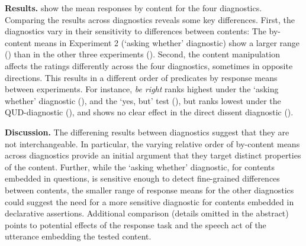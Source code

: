 \documentclass[11pt, a4paper]{article}
\begin{document}
\vspace{.1\baselineskip} \noindent
{\bf Results.}
   show the mean responses by content for the four diagnostics. Comparing the results across diagnostics reveals some key differences.
  First, the diagnostics vary in their sensitivity to differences between contents: The by-content means in Experiment 2 (`asking whether' diagnostic) show a larger range () than in the other three experiments ().
  Second, the content manipulation affects the ratings differently across the four diagnostics, sometimes in opposite directions. This results in a different order of predicates by response means between experiments.
  For instance, \emph{be right} ranks highest under the `asking whether' diagnostic (), and the `yes, but' test (), but ranks lowest under the QUD-diagnostic (), and shows no clear effect in the direct dissent diagnostic ().


\vspace{.1\baselineskip} \noindent
{\bf Discussion.}
  The differening results between diagnostics suggest that they are not interchangeable. In particular, the varying relative order of by-content means across diagnostics provide an initial argument that they target distinct properties of the content.
  Further, while the `asking whether' diagnostic, for contents embedded in questions, is sensitive enough to detect fine-grained differences between contents, the smaller range of response means for the other diagnostics could suggest the need for a more sensitive diagnostic for contents embedded in declarative assertions.
  Additional comparison \citealt{syrett_experimental_2015} (details omitted in the abstract) points to potential effects of the response task and the speech act of the utterance embedding the tested content.
\end{document}
